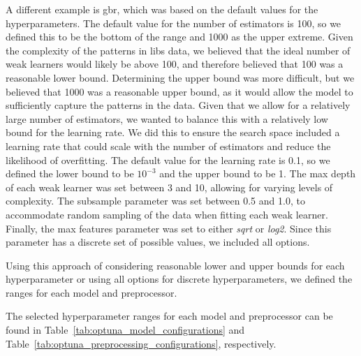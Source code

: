 A different example is \gls{gbr}, which was based on the default values for the hyperparameters.
The default value for the number of estimators is 100, so we defined this to be the bottom of the range and 1000 as the upper extreme. 
Given the complexity of the patterns in \gls{libs} data, we believed that the ideal number of weak learners would likely be above 100, and therefore believed that 100 was a reasonable lower bound. 
Determining the upper bound was more difficult, but we believed that 1000 was a reasonable upper bound, as it would allow the model to sufficiently capture the patterns in the data. 
Given that we allow for a relatively large number of estimators, we wanted to balance this with a relatively low bound for the learning rate. 
We did this to ensure the search space included a learning rate that could scale with the number of estimators and reduce the likelihood of overfitting. 
The default value for the learning rate is 0.1, so we defined the lower bound to be $10^{-3}$ and the upper bound to be 1. 
The max depth of each weak learner was set between 3 and 10, allowing for varying levels of complexity.
The subsample parameter was set between 0.5 and 1.0, to accommodate random sampling of the data when fitting each weak learner. 
Finally, the max features parameter was set to either \textit{sqrt} or \textit{log2}. Since this parameter has a discrete set of possible values, we included all options.

Using this approach of considering reasonable lower and upper bounds for each hyperparameter or using all options for discrete hyperparameters, we defined the ranges for each model and preprocessor.

The selected hyperparameter ranges for each model and preprocessor can be found in Table~\ref{tab:optuna_model_configurations} and Table~\ref{tab:optuna_preprocessing_configurations}, respectively.


